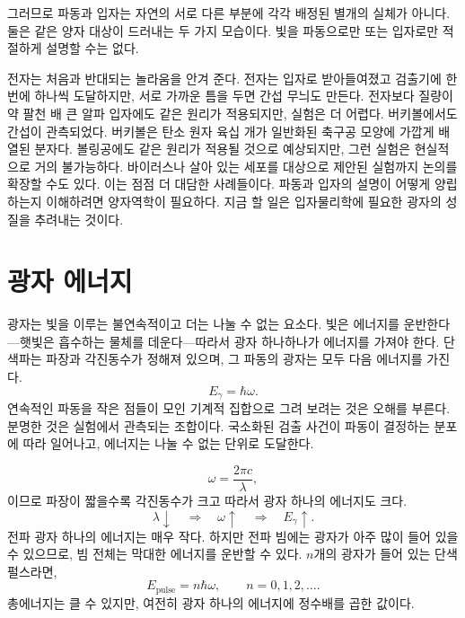 그러므로 파동과 입자는 자연의 서로 다른 부분에 각각 배정된 별개의 실체가 아니다. 둘은 같은 양자 대상이 드러내는 두 가지 모습이다. 빛을 파동으로만 또는 입자로만 적절하게 설명할 수는 없다.

전자는 처음과 반대되는 놀라움을 안겨 준다. 전자는 입자로 받아들여졌고 검출기에 한 번에 하나씩 도달하지만, 서로 가까운 틈을 두면 간섭 무늬도 만든다. 전자보다 질량이 약 팔천 배 큰 알파 입자에도 같은 원리가 적용되지만, 실험은 더 어렵다. 버키볼에서도 간섭이 관측되었다. 버키볼은 탄소 원자 육십 개가 일반화된 축구공 모양에 가깝게 배열된 분자다. 볼링공에도 같은 원리가 적용될 것으로 예상되지만, 그런 실험은 현실적으로 거의 불가능하다. 바이러스나 살아 있는 세포를 대상으로 제안된 실험까지 논의를 확장할 수도 있다. 이는 점점 더 대담한 사례들이다. 파동과 입자의 설명이 어떻게 양립하는지 이해하려면 양자역학이 필요하다. 지금 할 일은 입자물리학에 필요한 광자의 성질을 추려내는 것이다.

\section{광자 에너지}

광자는 빛을 이루는 불연속적이고 더는 나눌 수 없는 요소다. 빛은 에너지를 운반한다---햇빛은 흡수하는 물체를 데운다---따라서 광자 하나하나가 에너지를 가져야 한다. 단색파는 파장과 각진동수가 정해져 있으며, 그 파동의 광자는 모두 다음 에너지를 가진다.
\begin{equation}
E_\gamma=\hbar\omega.
\end{equation}
연속적인 파동을 작은 점들이 모인 기계적 집합으로 그려 보려는 것은 오해를 부른다. 분명한 것은 실험에서 관측되는 조합이다. 국소화된 검출 사건이 파동이 결정하는 분포에 따라 일어나고, 에너지는 나눌 수 없는 단위로 도달한다.

\begin{equation}
\omega=\frac{2\pi c}{\lambda},
\end{equation}이므로
파장이 짧을수록 각진동수가 크고 따라서 광자 하나의 에너지도 크다.
\begin{equation}
\lambda\downarrow
\quad\Longrightarrow\quad
\omega\uparrow
\quad\Longrightarrow\quad
E_\gamma\uparrow.
\end{equation}
전파 광자 하나의 에너지는 매우 작다. 하지만 전파 빔에는 광자가 아주 많이 들어 있을 수 있으므로, 빔 전체는 막대한 에너지를 운반할 수 있다. \(n\)개의 광자가 들어 있는 단색 펄스라면,
\begin{equation}
E_{\text{pulse}}=n\hbar\omega,
\qquad
n=0,1,2,\ldots.
\end{equation}
총에너지는 클 수 있지만, 여전히 광자 하나의 에너지에 정수배를 곱한 값이다.

